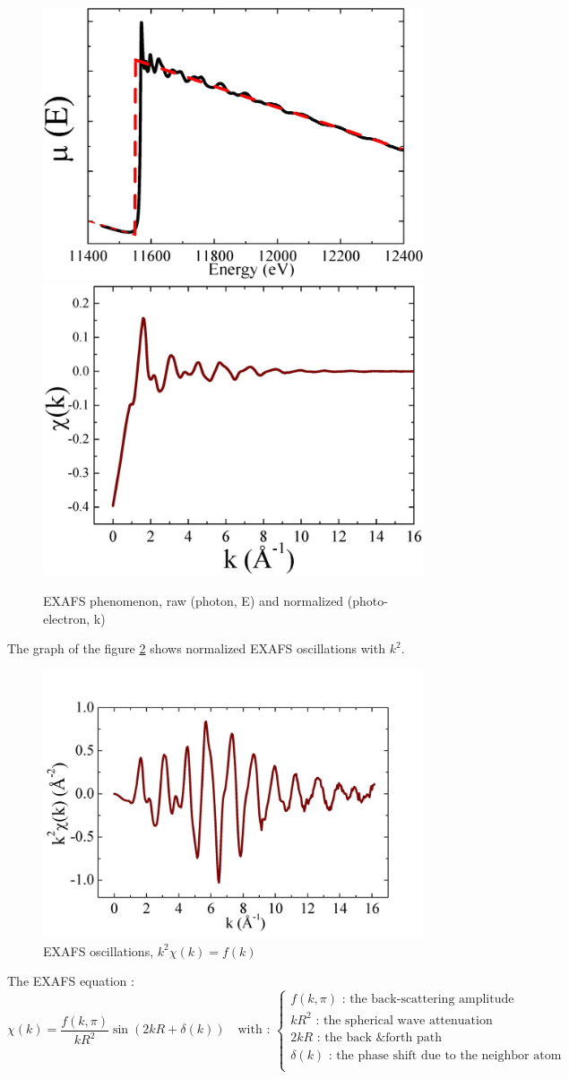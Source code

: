\documentclass[11pt,a4paper,oneside]{report}
\begin{document}
\begin{figure}[H]
    \begin{center}
        \includegraphics[height=0.35\textwidth]{Images/EXAFS2}
        \includegraphics[height=0.35\textwidth]{Images/relativeEXAFS}
        \caption{EXAFS phenomenon, raw (photon, E) and normalized (photo-electron, k)}
        \label{exafsgraph}
    \end{center}
\end{figure}

The graph of the figure \ref{exafsgraphtimesksquare} shows normalized EXAFS oscillations with $k^2$.

\begin{figure}[H]
    \begin{center}
        \includegraphics[height=0.35\textwidth]{Images/EXAFS3}
        \caption{EXAFS oscillations, $k^2\chi(k) = f (k)$}
        \label{exafsgraphtimesksquare}
    \end{center}
\end{figure}

The EXAFS equation :
\[  \chi(k) = \frac{f(k,\pi)}{kR^2}\sin(2kR+\delta(k))
\quad\text{with : } \left\{
\begin{array}{ll}
f(k,\pi)\text{ : the back-scattering amplitude}\\
kR^2\text{ : the spherical wave attenuation}\\
2kR\text{ : the back \& forth path}\\
\delta(k)\text{ : the phase shift due to the neighbor atom}\\
\end{array}
\right.
\]
\end{document}
